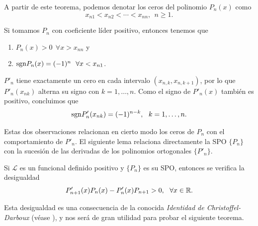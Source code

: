 A partir de este teorema, podemos denotar los ceros del polinomio $P_n(x)$ como
$$
x_{n1} < x_{n2} < \cdots < x_{nn}, \ \ n\geq 1.
$$

\begin{observacion}
    Si tomamos $P_n$ con coeficiente líder positivo, entonces tenemos que 
    \begin{enumerate}
        \item $P_n(x) > 0 \ \ \forall x>x_{nn}$ y 
        \item $\mathrm{sgn} P_n(x) = (-1)^{n}  \ \ \forall x<x_{n1}$.
    \end{enumerate}
\end{observacion}

\begin{observacion}
    $P'_n$ tiene exactamente un cero en cada intervalo $(x_{n,k},x_{n,k+1})$, por lo que $P'_n(x_{nk})$ alterna su signo con $k=1,\dots ,n$. Como el signo de $P'_n(x)$ también es positivo, concluimos que
    \begin{equation}
        \label{eq:signo-derivada}
        \mathrm{sgn} P'_n(x_{nk}) =(-1)^{n-k}, \ \ k = 1,\dots, n.
    \end{equation}
    

\end{observacion}

Estas dos observaciones relacionan en cierto modo los ceros de $P_n$ con el comportamiento de $P'_n$. El siguiente lema relaciona directamente la SPO $\{P_n\}$ con la sucesión de las derivadas de los polinomios ortogonales $\{P'_n\}$. 

\begin{lema}
    Si $\mathcal{L}$ es un funcional definido positivo y $\{P_n\}$ es su SPO, entonces se verifica la desigualdad
    \begin{equation}
        \label{eq:desigualdad-cd}
        P'_{n+1}(x)P_n(x) -P'_n(x)P_{n+1} > 0, \ \ \forall x\in\mathbb{R}.
    \end{equation}
\end{lema}

Esta desigualdad es una consecuencia de la conocida \textit{Identidad de Christoffel-Darboux} (véase \cite[Theorem 4.5]{chihara}), y nos será de gran utilidad para probar el siguiente teorema.

